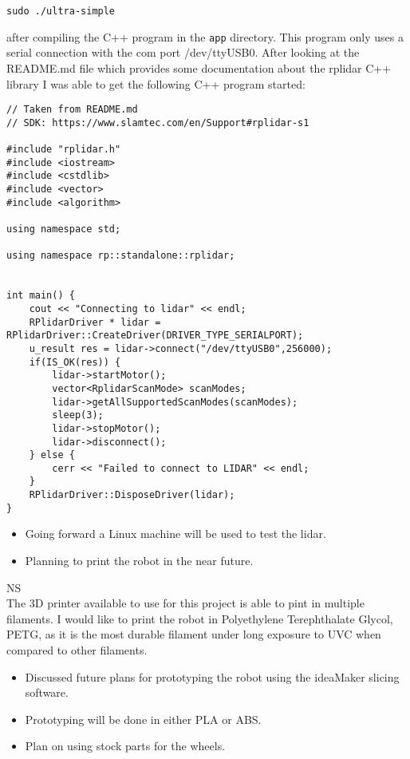 \documentclass[fontsize=11pt, %
                             paper=a4, %
                             twoside, %
                             captions=tableheading,
                             index=totoc,
                             hyperref]{labbook}
\begin{document}
\begin{addmargin}[0cm]{0cm}
\begin{Verbatim}
sudo ./ultra-simple
\end{Verbatim}
after compiling the C++ program in the \texttt{app} directory. This program only uses a serial connection with the com port /dev/ttyUSB$0$. After looking at the README.md file which provides some documentation about the rplidar C++ library I was able to get the following C++ program started:
\begin{Verbatim}
// Taken from README.md
// SDK: https://www.slamtec.com/en/Support#rplidar-s1

#include "rplidar.h"
#include <iostream>
#include <cstdlib>
#include <vector>
#include <algorithm>

using namespace std;

using namespace rp::standalone::rplidar;


int main() {
    cout << "Connecting to lidar" << endl;
	RPlidarDriver * lidar = RPlidarDriver::CreateDriver(DRIVER_TYPE_SERIALPORT);
    u_result res = lidar->connect("/dev/ttyUSB0",256000);
    if(IS_OK(res)) {
        lidar->startMotor();
        vector<RplidarScanMode> scanModes;
        lidar->getAllSupportedScanModes(scanModes);
        sleep(3);
        lidar->stopMotor();
        lidar->disconnect();
    } else {
        cerr << "Failed to connect to LIDAR" << endl;
    }
    RPlidarDriver::DisposeDriver(lidar);    
}
\end{Verbatim}

\begin{itemize}
\item Going forward a Linux machine will be used to test the lidar.
\item Planning to print the robot in the near future.
\end{itemize}
NS\\
The 3D printer available to use for this project is able to pint in multiple filaments. I would like to print the robot in Polyethylene Terephthalate Glycol, PETG, as it is the most durable filament under long exposure to UVC when compared to other filaments. 

\begin{itemize}
\item Discussed future plans for prototyping the robot using the ideaMaker slicing software.
\item Prototyping will be done in either PLA or ABS.
\item Plan on using stock parts for the wheels.
\end{itemize}


\end{addmargin}
\end{document}
